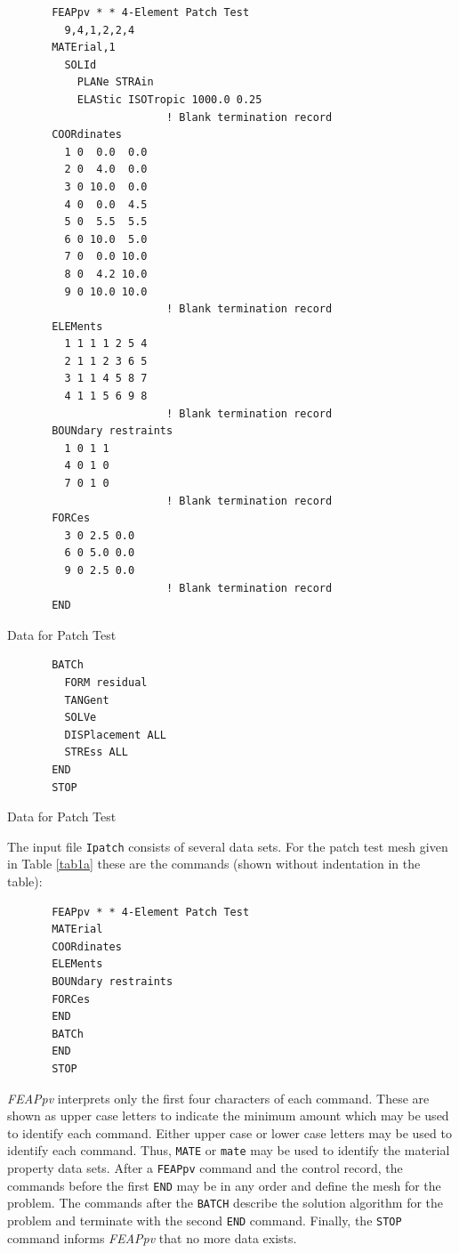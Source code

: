 \begin{table}
\begin{verbatim}
       FEAPpv * * 4-Element Patch Test
         9,4,1,2,2,4
       MATErial,1
         SOLId
           PLANe STRAin
           ELAStic ISOTropic 1000.0 0.25
                         ! Blank termination record
       COORdinates
         1 0  0.0  0.0
         2 0  4.0  0.0
         3 0 10.0  0.0
         4 0  0.0  4.5
         5 0  5.5  5.5
         6 0 10.0  5.0
         7 0  0.0 10.0
         8 0  4.2 10.0
         9 0 10.0 10.0
                         ! Blank termination record
       ELEMents
         1 1 1 1 2 5 4
         2 1 1 2 3 6 5
         3 1 1 4 5 8 7
         4 1 1 5 6 9 8
                         ! Blank termination record
       BOUNdary restraints
         1 0 1 1
         4 0 1 0
         7 0 1 0
                         ! Blank termination record
       FORCes
         3 0 2.5 0.0
         6 0 5.0 0.0
         9 0 2.5 0.0
                         ! Blank termination record
       END
\end{verbatim}
\caption{Data for Patch Test}
\label{tab1a}
\end{table}

\begin{table}
\begin{verbatim}
       BATCh
         FORM residual
         TANGent
         SOLVe
         DISPlacement ALL
         STREss ALL
       END
       STOP
\end{verbatim}
\caption{Data for Patch Test}
\label{tab1b}
\end{table}

The input file {\tt Ipatch} consists of several data sets.  For
the patch test mesh given in Table \ref{tab1a} these are the commands
(shown without indentation in the table):
\begin{verbatim}
       FEAPpv * * 4-Element Patch Test
       MATErial
       COORdinates
       ELEMents
       BOUNdary restraints
       FORCes
       END
       BATCh
       END
       STOP
\end{verbatim}
{\sl FEAPpv} interprets only the first four characters of each command.  These
are shown as upper case letters to indicate the minimum amount which may be
used to identify each command.  Either upper case or lower case letters
may be used to identify each command.  Thus, 
{\tt MATE} or {\tt mate} may be used to identify the material property
data sets. After a {\tt FEAPpv} command and the control record,
the commands before the first {\tt END}
may be in any order and define the mesh for the problem. The commands
after the {\tt BATCH} describe the solution algorithm for the problem and
terminate with the second {\tt END} command.  Finally, the {\tt STOP}
command informs {\sl FEAPpv} that no more data exists.


